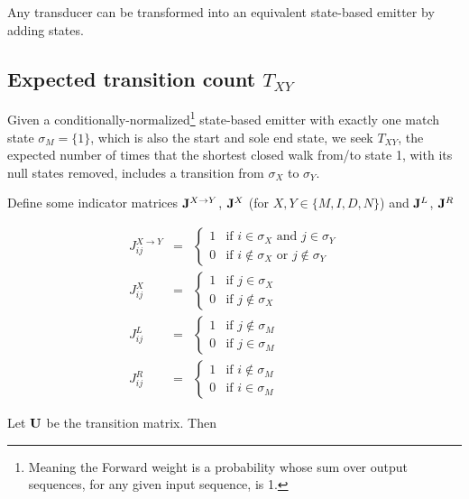 \documentclass{article}
\begin{document}
Any transducer can be transformed into an equivalent state-based emitter by adding states.

\subsection{Expected transition count $T_{XY}$}

Given a conditionally-normalized\footnote{Meaning the Forward weight is a probability whose sum over output sequences, for any given input sequence, is 1.}
state-based emitter with exactly one match state $\sigma_M = \{ 1 \}$, which is also the start and sole end state,
we seek $T_{XY}$, the expected number of times that the shortest closed walk from/to state 1,
with its null states removed, includes a transition from $\sigma_X$ to $\sigma_Y$.

\newcommand\nottomatch{L}
\newcommand\notfrommatch{R}
\newcommand\tox{X}
\newcommand\tonull{N}
\newcommand\xtoy{{X \to Y}}

Define some indicator matrices
${\bf J}^\xtoy$,
${\bf J}^\tox$
(for $X,Y \in \{ M, I, D, N \}$) and
${\bf J}^\nottomatch$,
${\bf J}^\notfrommatch$

\begin{eqnarray*}
  J^\xtoy_{ij} & = & \left\{ \begin{array}{ll} 1 & \mbox{if $i \in \sigma_X$ and $j \in \sigma_Y$} \\ 0 & \mbox{if $i \notin \sigma_X$ or $j \notin \sigma_Y$} \end{array} \right. \\
  J^\tox_{ij} & = & \left\{ \begin{array}{ll} 1 & \mbox{if $j \in \sigma_X$} \\ 0 & \mbox{if $j \notin \sigma_X$} \end{array} \right. \\
  J^\nottomatch_{ij} & = & \left\{ \begin{array}{ll} 1 & \mbox{if $j \notin \sigma_M$} \\ 0 & \mbox{if $j \in \sigma_M$} \end{array} \right. \\
  J^\notfrommatch_{ij} & = & \left\{ \begin{array}{ll} 1 & \mbox{if $i \notin \sigma_M$} \\ 0 & \mbox{if $i \in \sigma_M$} \end{array} \right.
\end{eqnarray*}

Let ${\bf U}$ be the transition matrix.
Then
\end{document}
